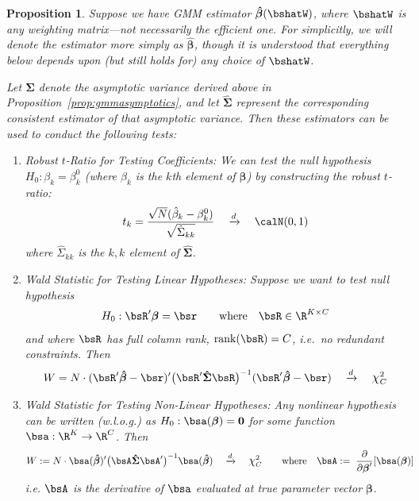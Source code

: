 \documentclass[12pt]{article}
\theoremstyle{plain}
\newtheorem{prop}[thm]{Proposition}
\theoremstyle{definition}
\theoremstyle{remark}
\newcommand*{\Chi}{\mbox{\large$\chi$}} %
\newcommand{\ra}{\rightarrow}
\newcommand{\bsSigma}{\boldsymbol{\Sigma}}
\newcommand{\bsbeta}{\boldsymbol{\beta}}
\newcommand{\bshatbeta}{\boldsymbol{\hat{\beta}}}
\newcommand{\bshatSigma}{\boldsymbol{\hat{\Sigma}}}
\renewcommand{\bso}{\boldsymbol{0}}
\newcommand{\rank}{\operatorname{rank}}
\newcommand{\dto}{\xrightarrow{d}}
\begin{document}
\begin{prop}
Suppose we have GMM estimator $\bshatbeta(\bshatW)$, where $\bshatW$ is
any weighting matrix---not necessarily the efficient one.
For simplicitly, we will denote the estimator  more simply as
$\bshatbeta$, though it is understood that everything below depends upon
(but still holds for) any choice of $\bshatW$.

Let $\bsSigma$ denote the asymptotic variance derived above in
Proposition~\ref{prop:gmmasymptotics}, and let $\bshatSigma$ represent
the corresponding consistent estimator of that asymptotic variance. Then
these estimators can be used to conduct the following tests:
\begin{enumerate}
  \item \emph{Robust $t$-Ratio for Testing Coefficients}: We can
    test the null hypothesis $H_0:\beta_k = \beta_k^0$ (where $\beta_k$
    is the $k$th element of $\bsbeta$) by constructing the
    \emph{robust $t$-ratio}:
    \begin{align*}
      t_k =
      \frac{\sqrt{N}(\hat{\beta}_k-\beta_k^0)}{\sqrt{\hat{\Sigma}_{kk}}}
      \quad\dto \quad \calN(0,1)
    \end{align*}
    where $\hat{\Sigma}_{kk}$ is the $k,k$ element of $\bshatSigma$.

  \item \emph{Wald Statistic for Testing Linear Hypotheses}:
    Suppose we want to test null hypothesis
    \begin{align*}
      H_0: \bsR'\bsbeta = \bsr
      \qquad \text{where} \quad \bsR \in \R^{K \times C}
    \end{align*}
    and where $\bsR$ has full column rank,
    $\rank(\bsR) = C$, i.e.\ no redundant constraints.
    Then
    \begin{align*}
      W = N\cdot
      (\bsR'\bshatbeta-\bsr)'
      \big(
      \bsR'\bshatSigma\bsR
      \big)^{-1}
      (\bsR'\bshatbeta-\bsr)
      \quad\dto\quad
      \Chi^2_C
    \end{align*}

  \item \emph{Wald Statistic for Testing Non-Linear Hypotheses}:
    Any nonlinear hypothesis can be written (w.l.o.g.) as
    $H_0: \bsa(\bsbeta) = \bso$ for some function $\bsa:\R^K\ra \R^C$.
    Then
    \begin{align*}
      W :=
      N \cdot \bsa(\bshatbeta)'
      \big(
      \bsA \bshatSigma \bsA'
      \big)^{-1}
      \bsa(\bshatbeta)
      \quad&\dto\quad
      \Chi^2_C
      \qquad
      \text{where} \quad
      \bsA := \; \frac{\partial}{\partial \bsbeta'}[\bsa(\bsbeta)]
    \end{align*}
    i.e. $\bsA$ is the derivative of $\bsa$ evaluated at true parameter
    vector $\bsbeta$.


\end{enumerate}
\end{prop}
\end{document}
